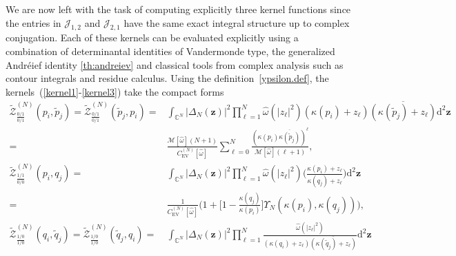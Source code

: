\documentclass[pdflatex,sn-mathphys-num]{sn-jnl}
\theoremstyle{thmstyleone}
\numberwithin{equation}{section}
\newcommand{\C}{\mathbb{C}}
\begin{document}
We are now left with the task of computing explicitly three kernel functions since the entries in $\mathcal{J}_{1,2}$ and $\mathcal{J}_{2,1}$ have the same exact integral structure up to complex conjugation. Each of these kernels can be evaluated explicitly using a combination of determinantal identities of Vandermonde type, the generalized Andr\'eief identity \ref{th:andreiev} and classical tools from complex analysis such as contour integrals and residue calculus. Using the definition~\eqref{ypsilon.def}, the kernels~(\ref{kernel1}-\ref{kernel3}) take the compact forms
\begin{align}
    \widetilde{\mathscr{Z}}^{\left ( N \right )}_{\frac{0/1}{0/1}}\left ( p_{i},\widetilde{p}_{j} \right )=\widetilde{\mathscr{Z}}^{\left ( N \right )}_{\frac{0/1}{0/1}}\left ( \widetilde{p}_{j},p_{i} \right )=&\int_{\C^{N}}^{} \left | \Delta_{N}\left ( \mathbf{z} \right ) \right |^{2}\prod\limits_{\ell=1}^{N}\widehat{\omega}\left ( \left | z_{\ell} \right |^{2} \right )\left ( \kappa\left(p_{i}\right)+z_{\ell} \right )\overline{\left ( \kappa\left(\widetilde{p}_{j}\right)+z_{\ell} \right )}\mathrm{d}^{2}\mathbf{z} \nonumber
    \\
    =&\frac{\mathcal{M}[\widehat{\omega}](N+1)}{C^{\left( N \right)}_{\mathrm{EV}}\left[\widehat{\omega}\right]}\sum\limits_{\ell=0}^{N}\frac{\left ( \kappa\left(p_{i}\right)\overline{\kappa\left(\widetilde{p}_{j}\right)} \right )^{\ell}}{\mathcal{M}\left [ \widehat{\omega} \right ]\left ( \ell+1 \right )},\label{kernel3.a}
    \\
    \widetilde{\mathscr{Z}}^{\left ( N \right )}_{\frac{1/1}{0/0}}\left ( p_{i},q_{j} \right )=&\int_{\C^{N}}^{}\left | \Delta_{N}\left ( \mathbf{z} \right ) \right |^{2}\prod\limits_{\ell=1}^{N}\widehat{\omega}\left ( \left | z_{\ell} \right |^{2} \right )\Bigg(\frac{ \kappa\left(p_{i}\right)+z_{\ell} }{ \kappa\left(q_{j}\right)+z_{\ell} }\Bigg)\mathrm{d}^{2}\mathbf{z}\nonumber
    \\
    =&\frac{1}{C^{\left( N \right)}_{\mathrm{EV}}\left[ \widehat{\omega} \right]}\Big(1+\Big[1-\frac{\kappa\left(q_{j}\right)}{\kappa\left(p_{i}\right)}\Big]\Upsilon_{N}\left( \kappa\left( p_{i} \right),\kappa\left( q_{j} \right) \right)\Big),\label{kernel3.b}
    \\
    \widetilde{\mathscr{Z}}^{\left ( N \right )}_{\frac{1/0}{1/0}}\left ( q_{i},\widetilde{q}_{j} \right )=\widetilde{\mathscr{Z}}^{\left ( N \right )}_{\frac{1/0}{1/0}}\left ( \widetilde{q}_{j} ,q_{i}\right )=&\int_{\C^{N}}^{}\left | \Delta_{N}\left ( \mathbf{z} \right ) \right |^{2}\prod\limits_{\ell=1}^{N}\frac{\widehat{\omega}\left ( \left | z_{\ell} \right |^{2} \right )}{\left ( \kappa\left( q_{i} \right)+z_{\ell} \right )\overline{\left ( \kappa\left( \widetilde{q}_{j} \right)+z_{\ell} \right )}}\mathrm{d}^{2}\mathbf{z}\nonumber

\end{align}
\end{document}
